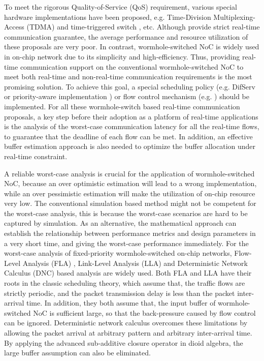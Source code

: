\documentclass[10pt,journal]{IEEEtran}
\begin{document}
To meet the rigorous Quality-of-Service (QoS) requirement, various special hardware implementations have been proposed, e.g. Time-Division Multiplexing-Access (TDMA) \cite{GoDR05} and time-triggered switch \cite{4617280}, etc. Although provide strict real-time communication guarantee, the average performance and resource utilization of these proposals are very poor. In contrast, wormhole-switched NoC is widely used in on-chip network due to its simplicity and high-efficiency. Thus, providing real-time communication support on the conventional wormhole-switched NoC to meet both real-time and non-real-time communication requirements is the most promising solution. To achieve this goal, a special scheduling policy (e.g. DifServ \cite{1411140} or priority-aware implementation \cite{Shi:2008:RCA:1397757.1397996}\cite{708526}\cite{627905}) or flow control mechanism (e.g. \cite{Li199649}\cite{707545}) should be implemented. For all these wormhole-switch based real-time communication proposals, a key step before their adoption as a platform of real-time applications is the analysis of the worst-case communication latency for all the real-time flows, to guarantee that the deadline of each flow can be met. In addition, an effective buffer estimation approach is also needed to optimize the buffer allocation under real-time constraint.

A reliable worst-case analysis is crucial for the application of wormhole-switched NoC, because an over optimistic estimation will lead to a wrong implementation, while an over pessimistic estimation will make the utilization of on-chip resource very low. The conventional simulation based method might not be competent for the worst-case analysis, this is because the worst-case scenarios are hard to be captured by simulation. As an alternative, the mathematical approach can establish the relationship between performance metrics and design parameters in a very short time, and giving the worst-case performance immediately. For the worst-case analysis of fixed-priority wormhole-switched on-chip networks, Flow-Level Analysis (FLA) \cite{Shi:2008:RCA:1397757.1397996}, Link-Level Analysis (LLA) \cite{73}\cite{189} and Deterministic Network Calculus (DNC) \cite{Qian489900} based analysis are widely used. Both FLA and LLA have their roots in the classic scheduling theory, which assume that, the traffic flows are strictly periodic, and the packet transmission delay is less than the packet inter-arrival time. In addition, they both assume that, the input buffer of wormhole-switched NoC is sufficient large, so that the back-pressure caused by flow control can be ignored. Deterministic network calculus overcomes these limitations by allowing the packet arrival at arbitrary pattern and arbitrary inter-arrival time. By applying the advanced sub-additive closure operator in dioid algebra, the large buffer assumption can also be eliminated.
\end{document}

